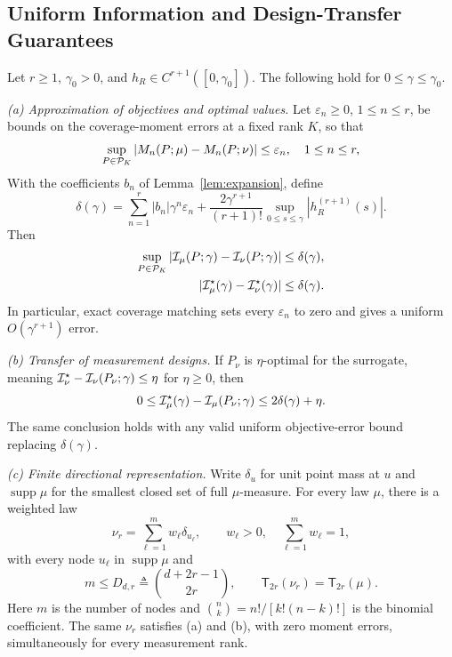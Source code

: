 \subsection{Uniform Information and Design-Transfer Guarantees}
\begin{theorem}\label{thm:representation}
Let $r\ge1$, $\gamma_0>0$, and $h_R\in C^{r+1}([0,\gamma_0])$. The following hold for $0\le\gamma\le\gamma_0$.

\emph{(a) Approximation of objectives and optimal values.} Let
$\varepsilon_n\ge0$, $1\le n\le r$, be bounds on the coverage-moment
errors at a fixed rank $K$, so that
\begin{equation}
\sup_{P\in\mathcal P_K}|M_n(P;\mu)-M_n(P;\nu)|\le\varepsilon_n,
\quad 1\le n\le r,
\end{equation}
With the coefficients $b_n$ of Lemma~\ref{lem:expansion}, define
\begin{equation}
\delta(\gamma)=\sum_{n=1}^r|b_n|\gamma^n\varepsilon_n
+\frac{2\gamma^{r+1}}{(r+1)!}\sup_{0\le s\le\gamma}|h_R^{(r+1)}(s)|.
\label{eq:representation_delta}
\end{equation}
Then
\begin{align}
\sup_{P\in\mathcal P_K}|\mathcal I_\mu(P;\gamma)-\mathcal I_\nu(P;\gamma)|&\le\delta(\gamma),\label{eq:equiv_bound}\\
|\mathcal I_\mu^\star(\gamma)-\mathcal I_\nu^\star(\gamma)|&\le\delta(\gamma).\label{eq:optimal_equiv_bound}
\end{align}
In particular, exact coverage matching sets every $\varepsilon_n$ to zero and gives a uniform $O(\gamma^{r+1})$ error.

\emph{(b) Transfer of measurement designs.} If $P_\nu$ is $\eta$-optimal for the surrogate, meaning $\mathcal I_\nu^\star-\mathcal I_\nu(P_\nu;\gamma)\le\eta$ for $\eta\ge0$, then
\begin{equation}
0\le\mathcal I_\mu^\star(\gamma)-\mathcal I_\mu(P_\nu;\gamma)\le2\delta(\gamma)+\eta.
\label{eq:compression_regret}
\end{equation}
The same conclusion holds with any valid uniform objective-error bound replacing $\delta(\gamma)$.

\emph{(c) Finite directional representation.} Write $\delta_u$ for unit
point mass at $u$ and $\operatorname{supp}\mu$ for the smallest closed set
of full $\mu$-measure. For every law $\mu$, there is a weighted law
\begin{equation}
\nu_r=\sum_{\ell=1}^m w_\ell\delta_{u_\ell},\qquad
w_\ell>0,\quad\sum_{\ell=1}^m w_\ell=1,
\end{equation}
with every node $u_\ell$ in $\operatorname{supp}\mu$ and
\begin{equation}
m\le D_{d,r}\triangleq\binom{d+2r-1}{2r},\qquad
\mathsf T_{2r}(\nu_r)=\mathsf T_{2r}(\mu).
\label{eq:support_bound}
\end{equation}
Here $m$ is the number of nodes and $\binom{n}{k}=n!/[k!(n-k)!]$ is the binomial coefficient. The same $\nu_r$ satisfies (a) and (b), with zero moment errors, simultaneously for every measurement rank.
\end{theorem}
